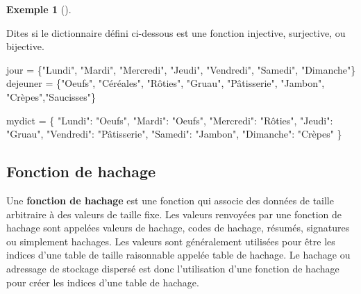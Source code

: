 \documentclass[
  letterpaper,
]{scrbook}
\newenvironment{Shaded}{}{}
\newcommand{\NormalTok}[1]{#1}
\newcommand{\OperatorTok}[1]{\textcolor[rgb]{0.40,0.40,0.40}{#1}}
\newcommand{\StringTok}[1]{\textcolor[rgb]{0.25,0.44,0.63}{#1}}
\theoremstyle{plain}
\theoremstyle{definition}
\newtheorem{example}{Exemple}[chapter]
\theoremstyle{definition}
\theoremstyle{remark}
\begin{document}
\leavevmode{}%
\begin{example}[]\label{exm-jour-dejeuner-non-injective}

Dites si le dictionnaire défini ci-dessous est une fonction injective,
surjective, ou bijective.

\hypertarget{dictionnaries-days-breakfast-non-injective}{}
\begin{Shaded}
\begin{Highlighting}[]
\NormalTok{jour }\OperatorTok{=}\NormalTok{ \{}\StringTok{"Lundi"}\NormalTok{, }\StringTok{"Mardi"}\NormalTok{, }\StringTok{"Mercredi"}\NormalTok{, }\StringTok{"Jeudi"}\NormalTok{, }\StringTok{"Vendredi"}\NormalTok{, }\StringTok{"Samedi"}\NormalTok{, }\StringTok{"Dimanche"}\NormalTok{\}}
\NormalTok{dejeuner }\OperatorTok{=}\NormalTok{ \{}\StringTok{"Oeufs"}\NormalTok{, }\StringTok{"Céréales"}\NormalTok{, }\StringTok{"Rôties"}\NormalTok{, }\StringTok{"Gruau"}\NormalTok{, }\StringTok{"Pâtisserie"}\NormalTok{, }\StringTok{"Jambon"}\NormalTok{, }\StringTok{"Crèpes"}\NormalTok{,}\StringTok{"Saucisses"}\NormalTok{\}}

\NormalTok{mydict }\OperatorTok{=}\NormalTok{ \{}
    \StringTok{"Lundi"}\NormalTok{: }\StringTok{"Oeufs"}\NormalTok{,}
    \StringTok{"Mardi"}\NormalTok{: }\StringTok{"Oeufs"}\NormalTok{,}
    \StringTok{"Mercredi"}\NormalTok{: }\StringTok{"Rôties"}\NormalTok{,}
    \StringTok{"Jeudi"}\NormalTok{: }\StringTok{"Gruau"}\NormalTok{,}
    \StringTok{"Vendredi"}\NormalTok{: }\StringTok{"Pâtisserie"}\NormalTok{,}
    \StringTok{"Samedi"}\NormalTok{: }\StringTok{"Jambon"}\NormalTok{,}
    \StringTok{"Dimanche"}\NormalTok{: }\StringTok{"Crèpes"}
\NormalTok{\}}
\end{Highlighting}
\end{Shaded}

\end{example}

\hypertarget{fonction-de-hachage}{%
\subsection{Fonction de hachage}\label{fonction-de-hachage}}

Une \textbf{fonction de hachage} est une fonction qui associe des
données de taille arbitraire à des valeurs de taille fixe. Les valeurs
renvoyées par une fonction de hachage sont appelées valeurs de hachage,
codes de hachage, résumés, signatures ou simplement hachages. Les
valeurs sont généralement utilisées pour être les indices d'une table de
taille raisonnable appelée table de hachage. Le hachage ou adressage de
stockage dispersé est donc l'utilisation d'une fonction de hachage pour
créer les indices d'une table de hachage.
\end{document}
